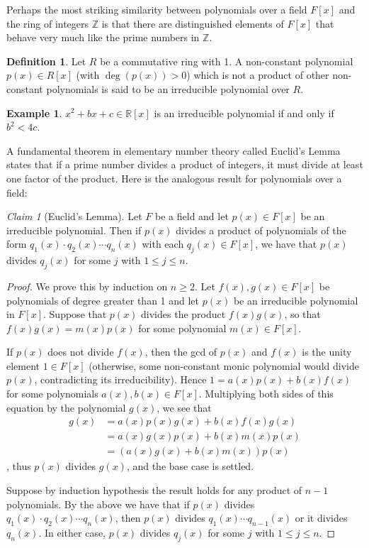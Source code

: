 \documentclass[12pt,letterpaper,DIV=11,final]{scrartcl}
\theoremstyle{plain}
\theoremstyle{definition}
\newtheorem{definition}{Definition}[section]
\newtheorem{example}{Example}[section]
\theoremstyle{remark}
\newtheorem{claim}{Claim}
\begin{document}
Perhaps the most striking similarity between polynomials over a field $F[x]$ and the ring of integers $\mathbb{Z}$ is that there are distinguished elements of $F[x]$ that behave very much like the prime numbers in $\mathbb{Z}$.

\begin{definition}
  Let $R$ be a commutative ring with 1.
  A non-constant polynomial $p(x) \in R[x]$ (with $\deg(p(x)) > 0$) which is not a product of other non-constant polynomials is said to be an irreducible polynomial over $R$.
\end{definition}

\begin{example}
  $x^2 + bx + c \in \mathbb{R}[x]$ is an irreducible polynomial if and only if $b^2 < 4c$.
\end{example}

A fundamental theorem in elementary number theory called Euclid's Lemma states that if a prime number divides a product of integers, it must divide at least one factor of the product.
Here is the analogous result for polynomials over a field:

\begin{claim}[Euclid's Lemma]\label{claim:euclidlemma}
  Let $F$ be a field and let $p(x) \in F[x]$ be an irreducible polynomial.
  Then if $p(x)$ divides a product of polynomials of the form $q_1(x) \cdot q_2(x) \cdots q_n(x)$ with each $q_j(x) \in F[x]$, we have that $p(x)$ divides $q_j(x)$ for some $j$ with $1 \leq j \leq n$.

  \begin{proof}
    We prove this by induction on $n \geq 2$.
    Let $f(x), g(x) \in F[x]$ be polynomials of degree greater than 1 and let $p(x)$ be an irreducible polynomial in $F[x]$.
    Suppose that $p(x)$ divides the product $f(x) g(x)$, so that $f(x) g(x) = m(x) p(x)$ for some polynomial $m(x) \in F[x]$.

    If $p(x)$ does not divide $f(x)$, then the gcd of $p(x)$ and $f(x)$ is the unity element $1 \in F[x]$ (otherwise, some non-constant monic polynomial would divide $p(x)$, contradicting its irreducibility).
    Hence $1 = a(x) p(x) + b(x) f(x)$ for some polynomials $a(x), b(x) \in F[x]$.
    Multiplying both sides of this equation by the polynomial $g(x)$, we see that
    \begin{align*}
      g(x) &= a(x) p(x) g(x) + b(x) f(x) g(x) \\
           &= a(x) g(x) p(x) + b(x) m(x) p(x) \\
           &= \left( a(x) g(x) + b(x) m(x) \right) p(x)
    \end{align*},
    thus $p(x)$ divides $g(x)$, and the base case is settled.

    Suppose by induction hypothesis the result holds for any product of $n - 1$ polynomials.
    By the above we have that if $p(x)$ divides $q_1(x) \cdot q_2(x) \cdots q_n(x)$, then $p(x)$ divides $q_1(x) \cdots q_{n - 1}(x)$ or it divides $q_n(x)$.
    In either case, $p(x)$ divides $q_j(x)$ for some $j$ with $1 \leq j \leq n$.
  \end{proof}
\end{claim}
\end{document}
